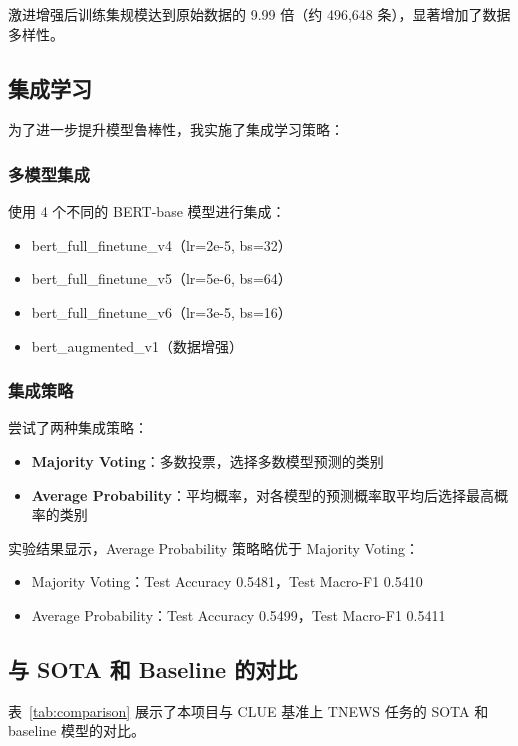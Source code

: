 \documentclass[a4paper]{article}
\begin{document}
激进增强后训练集规模达到原始数据的 9.99 倍（约 496,648 条），显著增加了数据多样性。

\subsection{集成学习}

为了进一步提升模型鲁棒性，我实施了集成学习策略：

\subsubsection{多模型集成}

使用 4 个不同的 BERT-base 模型进行集成：
\begin{itemize}
    \item bert\_full\_finetune\_v4（lr=2e-5, bs=32）
    \item bert\_full\_finetune\_v5（lr=5e-6, bs=64）
    \item bert\_full\_finetune\_v6（lr=3e-5, bs=16）
    \item bert\_augmented\_v1（数据增强）
\end{itemize}

\subsubsection{集成策略}

尝试了两种集成策略：
\begin{itemize}
    \item \textbf{Majority Voting}：多数投票，选择多数模型预测的类别
    \item \textbf{Average Probability}：平均概率，对各模型的预测概率取平均后选择最高概率的类别
\end{itemize}

实验结果显示，Average Probability 策略略优于 Majority Voting：
\begin{itemize}
    \item Majority Voting：Test Accuracy 0.5481，Test Macro-F1 0.5410
    \item Average Probability：Test Accuracy 0.5499，Test Macro-F1 0.5411
\end{itemize}

\subsection{与 SOTA 和 Baseline 的对比}

表~\ref{tab:comparison} 展示了本项目与 CLUE 基准上 TNEWS 任务的 SOTA 和 baseline 模型的对比。
\end{document}
